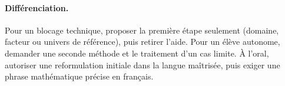 \paragraph{Différenciation.} Pour un blocage technique, proposer la première étape seulement (domaine, facteur ou univers de référence), puis retirer l’aide. Pour un élève autonome, demander une seconde méthode et le traitement d’un cas limite. À l’oral, autoriser une reformulation initiale dans la langue maîtrisée, puis exiger une phrase mathématique précise en français.
